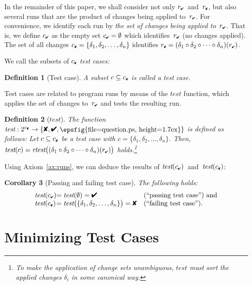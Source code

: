 \documentclass{acm_proc_article-sp}
\newcommand{\PASS}{\text{\ding{52}}\xspace}
\newcommand{\FAIL}{\text{\ding{56}}\xspace}
\newcommand{\UNRESOLVED}{\lower0.1ex\hbox{\epsfig{file=question.ps, 
      height=1.7ex}}}
\newcommand{\rpass}{{r_{\scriptscriptstyle \PASS}}}
\newcommand{\rfail}{{r_{\scriptscriptstyle \FAIL}}}
\newcommand{\cpass}{{c_{\scriptscriptstyle \PASS}}}
\newcommand{\cfail}{{c_{\scriptscriptstyle \FAIL}}}
\newcommand{\rtest}{\textit{rtest}\xspace}
\newcommand{\test}{\textit{test}\xspace}
\theoremstyle{plain}
\newtheorem{definition}{Definition}
\newtheorem{corollary}[definition]{Corollary}
\let\oldfootnote=\footnote
\renewcommand{\footnote}[1]{\oldfootnote{\let\small=\scriptsize #1}}
\begin{document}
In the remainder of this paper, we shall consider not only
$\rpass$~and~$\rfail$, but also several runs that are the product of
changes being applied to~$\rpass$.  For convenience, we identify each
run by \emph{the set of changes being applied to~$\rpass$.}  That is,
we define $\cpass$ as the empty set $\cpass = \emptyset$ which
identifies~$\rpass$ (no changes applied).  The set of all changes
$\cfail = \{\delta_1, \delta_2, \dots, \delta_n\}$ identifies $\rfail = (\delta_1 \circ \delta_2 \circ
\dots \circ \delta_n)(\rpass)$.

We call the subsets of $\cfail$ \emph{test cases:}

\begin{definition}[Test case]
  A subset $c \subseteq \cfail$ is called a \emph{test case.}
\end{definition}

Test cases are related to program runs by means of the $\test$
function, which applies the set of changes to~$\rpass$ and tests the
resulting run.

\begin{definition}[$\test$]
  The function $\test: 2^\cfail \to \{\FAIL, \PASS, \UNRESOLVED\}$ is
  defined as follows: Let $c \subseteq \cfail$ be a test case with $c = \{\delta_1,
  \delta_2, \dots, \delta_n\}$.  Then, $\test(c) = \rtest\bigl((\delta_1 \circ \delta_2 \circ \dots \circ
  \delta_n)(\rpass)\bigr)$ holds.\footnote{To make the application of
    change sets unambiguous, $\test$ must sort the applied changes
    $\delta_i$ in some canonical way.}
\end{definition}

Using Axiom~\ref{ax:runs}, we can deduce the results of
$\test(\cpass)$~and~$\test(\cfail)$:

\begin{corollary}[Passing and failing test case] The following holds:
\label{cor:wynot}
$$
\begin{array}{l@{}ll}
\test(\cpass) &= \test(\emptyset) = \PASS & \text{(``passing test case'') and} \\
\test(\cfail) &= \test\bigl(\{\delta_1, \delta_2, \dots, \delta_n\}\bigr) = \FAIL & \text{(``failing test case'').}
\end{array}
$$
\end{corollary}


\section{Minimizing Test Cases}
\label{sec:minimizing-test-cases}
\end{document}
